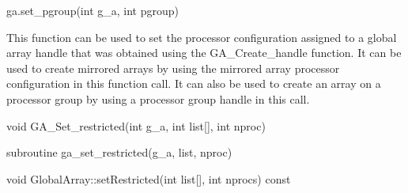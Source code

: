 \documentclass[12pt]{article}
\begin{document}
\begin{pyapi}
\begin{pycode}
ga.set_pgroup(int g_a, int pgroup)
\end{pycode}
\begin{funcargs}
\end{funcargs}
\end{pyapi}

\gcoll

\begin{desc}

This function can be used to set the processor configuration assigned to a
global array handle that was obtained using the GA_Create_handle function. It
can be used to create mirrored arrays by using the mirrored array processor
configuration in this function call. It can also be used to create an array on
a processor group by using a processor group handle in this call.

\end{desc}



\begin{capi}
\begin{ccode}
void GA_Set_restricted(int g_a, int list[], int nproc)
\end{ccode}
\begin{funcargs}
\end{funcargs}
\end{capi}

\begin{fapi}
\begin{fcode}
subroutine ga_set_restricted(g_a, list, nproc)
\end{fcode}
\begin{funcargs}
\end{funcargs}
\end{fapi}

\begin{cxxapi}
\begin{cxxcode}
void GlobalArray::setRestricted(int list[], int nprocs) const
\end{cxxcode}
\begin{funcargs}
\end{funcargs}
\end{cxxapi}
\end{document}

